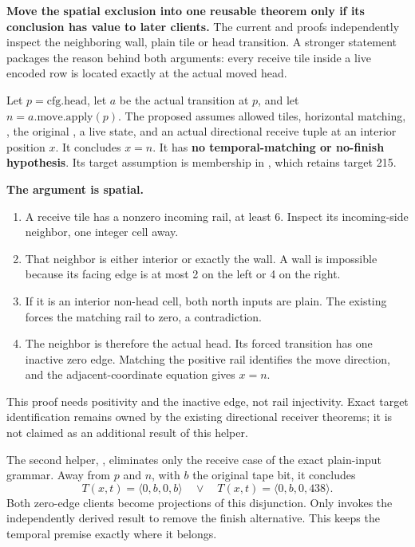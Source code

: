 \textbf{Move the spatial exclusion into one reusable theorem only if its conclusion has value to later clients.} The current  and  proofs independently inspect the neighboring wall, plain tile or head transition. A stronger statement packages the reason behind both arguments: every receive tile inside a live encoded row is located exactly at the actual moved head.

Let $p=\mathrm{cfg.head}$, let $a$ be the actual transition at $p$, and let $n=a.\mathrm{move.apply}(p)$. The proposed  assumes allowed tiles, horizontal matching, , the original , a live state, and an actual directional receive tuple at an interior position $x$. It concludes $x=n$. It has \textbf{no temporal-matching or no-finish hypothesis}. Its target assumption is membership in , which retains target 215.

\textbf{The argument is spatial.}
\begin{enumerate}
\item A receive tile has a nonzero incoming rail, at least 6. Inspect its incoming-side neighbor, one integer cell away.
\item That neighbor is either interior or exactly the wall. A wall is impossible because its facing edge is at most 2 on the left or 4 on the right.
\item If it is an interior non-head cell, both north inputs are plain. The existing  forces the matching rail to zero, a contradiction.
\item The neighbor is therefore the actual head. Its forced transition has one inactive zero edge. Matching the positive rail identifies the move direction, and the adjacent-coordinate equation gives $x=n$.
\end{enumerate}
This proof needs positivity and the inactive edge, not rail injectivity. Exact target identification remains owned by the existing directional receiver theorems; it is not claimed as an additional result of this helper.

The second helper, , eliminates only the receive case of the exact plain-input grammar. Away from $p$ and $n$, with $b$ the original tape bit, it concludes
\[
 T(x,t)=\langle0,b,0,b\rangle\quad\lor\quad
 T(x,t)=\langle0,b,0,438\rangle.
\]
Both zero-edge clients become projections of this disjunction. Only  invokes the independently derived  result to remove the finish alternative. This keeps the temporal premise exactly where it belongs.

